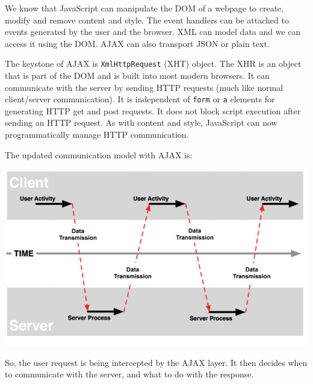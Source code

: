 \documentclass[a4paper, openany]{memoir}
\begin{document}
\noindent We know that JavaScript can manipulate the DOM of a webpage to create, modify and remove content and style. The event handlers can be attached to events generated by the user and the browser. XML can model data and we can access it using the DOM. AJAX can also transport JSON or plain text.

\noindent The keystone of AJAX is \texttt{XmlHttpRequest} (XHT) object. The XHR is an object that is part of the DOM and is built into most modern browsers. It can communicate with the server by sending HTTP requests (much like normal client/server communication). It is independent of \texttt{form} or \texttt{a} elements for generating HTTP get and post requests. It does not block script execution after sending an HTTP request. As with content and style, JavaScript can now programmatically manage HTTP communication.

\noindent The updated communication model with AJAX is:
\begin{center}
    \includegraphics[scale=0.5]{src/L16I1.PNG}
\end{center}
So, the user request is being intercepted by the AJAX layer. It then decides when to communicate with the server, and what to do with the response.
\end{document}
